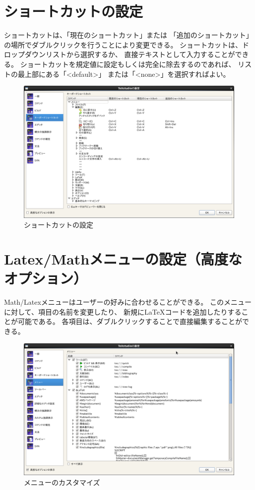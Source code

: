 \section{ショートカットの設定}

ショートカットは、「現在のショートカット」または
「追加のショートカット」の場所でダブルクリックを行うことにより変更できる。
ショートカットは、ドロップダウンリストから選択するか、
直接テキストとして入力することができる。
ショートカットを規定値に設定もしくは完全に除去するのであれば、
リストの最上部にある「\textless{}default\textgreater{}」
または「\textless{}none\textgreater{}」を選択すればよい。

\begin{figure}[H]
  \centering
  \includegraphics[width=.8\linewidth]{configure_shortcuts.png}
  \caption{ショートカットの設定}
\end{figure}

\section{Latex/Mathメニューの設定（高度なオプション）}

Math/Latexメニューはユーザーの好みに合わせることができる。
このメニューに対して、項目の名前を変更したり、
新規にLaTeXコードを追加したりすることが可能である。
各項目は、ダブルクリックすることで直接編集することができる。

\begin{figure}[H]
  \centering
  \includegraphics[width=.8\linewidth]{configure_customizeMenu.png}
  \caption{メニューのカスタマイズ}
\end{figure}

